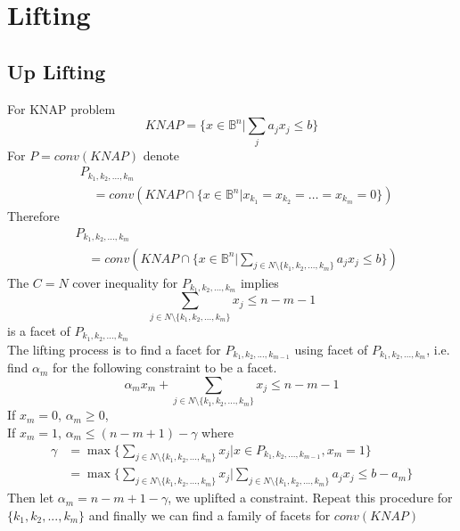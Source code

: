 			\section{Lifting}
				\subsection{Up Lifting}
					For KNAP problem
					\begin{equation}
						KNAP = \{x\in \mathbb{B}^n | \sum_j a_jx_j \le b\} 
					\end{equation}
					For $P=conv(KNAP)$ denote\\
					\begin{align}
						&P_{k_1, k_2, ..., k_m} \\
						&\quad =conv(KNAP\cap \{x\in \mathbb{B}^{n}|x_{k_1}=x_{k_2}=\dots=x_{k_m}=0\}) 
					\end{align}
					Therefore
					\begin{align}
						&P_{k_1, k_2, ..., k_m} \\
						&\quad=conv(KNAP\cap \{x\in \mathbb{B}^{n}|\sum_{j\in N\setminus \{k_1, k_2, ..., k_m\}} a_j x_j \le b\}) 
					\end{align}
					The $C=N$ cover inequality for $P_{k_1, k_2, ..., k_m}$ implies
					\begin{equation}
						\sum_{j\in N\setminus \{k_1, k_2, ..., k_m\}} x_j \le n-m-1 
					\end{equation}
					is a facet of $P_{k_1, k_2, ..., k_m}$\\
					The lifting process is to find a facet for $P_{k_1, k_2, ..., k_{m-1}}$ using facet of $P_{k_1, k_2, ..., k_m}$, i.e. find $\alpha_{m}$ for the following constraint to be a facet.
					\begin{equation}
						\alpha_m x_m + \sum_{j\in N\setminus \{k_1, k_2, ..., k_m\}} x_j \le n-m-1 
					\end{equation}
					If $x_m=0$, $\alpha_m \ge 0$,\\
					If $x_m=1$, $\alpha_m \le (n-m+1) - \gamma$ where
					\begin{align}
						\gamma &= \max\{\sum_{j\in N\setminus\{k_1, k_2, ..., k_m\}}x_j|x\in P_{k_1, k_2, ..., k_{m-1}}, x_m=1\} \\
						&= \max\{\sum_{j\in N\setminus\{k_1, k_2, ..., k_m\}}x_j|\sum_{j \in N \setminus \{k_1, k_2, ..., k_m\}}a_jx_j\le b-a_m\} 
					\end{align}
					Then let $\alpha_m = n-m+1-\gamma$, we uplifted a constraint. Repeat this procedure for $\{k_1, k_2, ..., k_m\}$ and finally we can find a family of facets for $conv(KNAP)$


